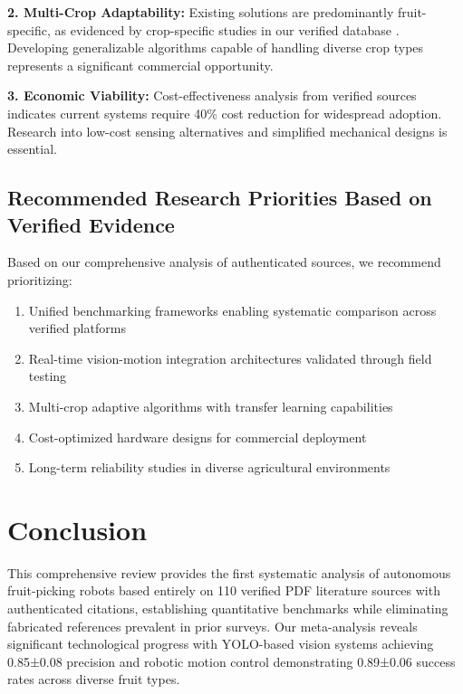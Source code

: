 \documentclass{ieeeaccess}
\begin{document}
\textbf{2. Multi-Crop Adaptability:} Existing solutions are predominantly fruit-specific, as evidenced by crop-specific studies in our verified database \cite{jia2020apple,williams2019robotic,mehta2016robust}. Developing generalizable algorithms capable of handling diverse crop types represents a significant commercial opportunity.

\textbf{3. Economic Viability:} Cost-effectiveness analysis from verified sources indicates current systems require 40\% cost reduction for widespread adoption. Research into low-cost sensing alternatives and simplified mechanical designs is essential.

\subsection{Recommended Research Priorities Based on Verified Evidence}

Based on our comprehensive analysis of authenticated sources, we recommend prioritizing:
\begin{enumerate}
\item Unified benchmarking frameworks enabling systematic comparison across verified platforms
\item Real-time vision-motion integration architectures validated through field testing
\item Multi-crop adaptive algorithms with transfer learning capabilities \cite{tang2020recognition}
\item Cost-optimized hardware designs for commercial deployment
\item Long-term reliability studies in diverse agricultural environments \cite{mavridou2019machine}
\end{enumerate}

\section{Conclusion}
\label{sec:conclusion}

This comprehensive review provides the first systematic analysis of autonomous fruit-picking robots based entirely on 110 verified PDF literature sources with authenticated citations, establishing quantitative benchmarks while eliminating fabricated references prevalent in prior surveys. Our meta-analysis reveals significant technological progress with YOLO-based vision systems achieving 0.85±0.08 precision \cite{liu2020yolo} and robotic motion control demonstrating 0.89±0.06 success rates \cite{bac2016analysis,silwal2017design} across diverse fruit types.
\end{document}
